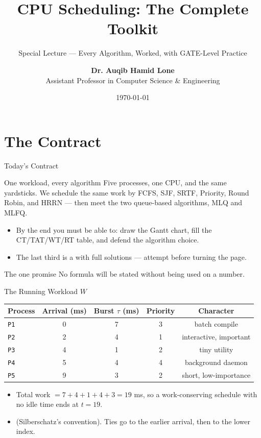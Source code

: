 \documentclass[aspectratio=169]{beamer}
\title{CPU Scheduling: The Complete Toolkit}
\subtitle{Special Lecture --- Every Algorithm, Worked, with GATE-Level Practice}
\author[Dr. Auqib Hamid Lone]{%
  \textbf{Dr. Auqib Hamid Lone}\\
  \small Assistant Professor in Computer Science \& Engineering
}
\institute[GCET Ganderbal]{%
  \small\textbf{PCC CS-502: Operating Systems}\\[0.3em]
  Department of Computer Science \& Engineering\\
  Government College of Engineering \& Technology (GCET), Ganderbal
}
\date[\today]{\small\today}
\begin{document}
\frame{\titlepage}

\section{The Contract}

\begin{frame}{Today's Contract}
  \begin{block}{One workload, every algorithm}
    Five processes, one CPU, and the same yardsticks. We schedule the same
    work by FCFS, SJF, SRTF, Priority, Round Robin, and HRRN --- then meet
    the two queue-based algorithms, MLQ and MLFQ.
  \end{block}
  \begin{itemize}
    \item By the end you must be able to: draw the Gantt chart, fill the
      CT/TAT/WT/RT table, and defend the algorithm choice.
    \item The last third is a  with full
      solutions --- attempt before turning the page.
  \end{itemize}
  \vspace{0.15cm}
  \begin{alertblock}{The one promise}
    No formula will be stated without being used on a number.
  \end{alertblock}
\end{frame}

\begin{frame}{The Running Workload $W$}
  \centering
  \renewcommand{\arraystretch}{1.25}
  \begin{tabular}{lcccc}
    \toprule
    \textbf{Process} & \textbf{Arrival (ms)} & \textbf{Burst $\tau$ (ms)} &
    \textbf{Priority} & \textbf{Character} \\
    \midrule
    \texttt{P1} & 0 & 7 & 3 & batch compile \\
    \texttt{P2} & 2 & 4 & 1 & interactive, important \\
    \texttt{P3} & 4 & 1 & 2 & tiny utility \\
    \texttt{P4} & 5 & 4 & 4 & background daemon \\
    \texttt{P5} & 9 & 3 & 2 & short, low-importance \\
    \bottomrule
  \end{tabular}
  \vspace{0.3cm}
  \begin{itemize}
    \item Total work $=7+4+1+4+3=19$ ms, so a work-conserving schedule with
      no idle time ends at $t=19$.
    \item {} (Silberschatz's
      convention). Ties go to the earlier arrival, then to the lower index.
  \end{itemize}
\end{frame}
\end{document}
